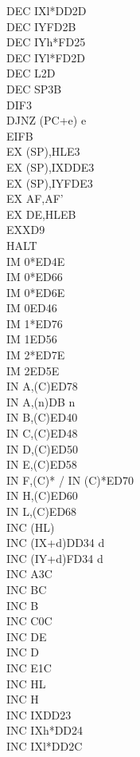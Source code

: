 \documentclass[oneside,a4paper]{book}
\begin{document}
\begin{multicols}{3}
{\begin{tabbing}
DEC IXl*\>DD2D\\
DEC IY\>FD2B\\
DEC IYh*\>FD25\\
DEC IYl*\>FD2D\\
DEC L\>2D\\
DEC SP\>3B\\
DI\>F3\\
DJNZ (PC+e) e\\
EI\>FB\\
EX (SP),HL\>E3\\
EX (SP),IX\>DDE3\\
EX (SP),IY\>FDE3\\
EX AF,AF'\\
EX DE,HL\>EB\\
EXX\>D9\\
HALT\\
IM 0*\>ED4E\\
IM 0*\>ED66\\
IM 0*\>ED6E\\
IM 0\>ED46\\
IM 1*\>ED76\\
IM 1\>ED56\\
IM 2*\>ED7E\\
IM 2\>ED5E\\
IN A,(C)\>ED78\\
IN A,(n)\>DB n\\
IN B,(C)\>ED40\\
IN C,(C)\>ED48\\
IN D,(C)\>ED50\\
IN E,(C)\>ED58\\
IN F,(C)* / IN (C)*\>ED70\\
IN H,(C)\>ED60\\
IN L,(C)\>ED68\\
INC (HL)\\
INC (IX+d)\>DD34 d\\
INC (IY+d)\>FD34 d\\
INC A\>3C\\
INC BC\\
INC B\\
INC C\>0C\\
INC DE\\
INC D\\
INC E\>1C\\
INC HL\\
INC H\\
INC IX\>DD23\\
INC IXh*\>DD24\\
INC IXl*\>DD2C\\

\end{tabbing}}
\end{multicols}
\end{document}
